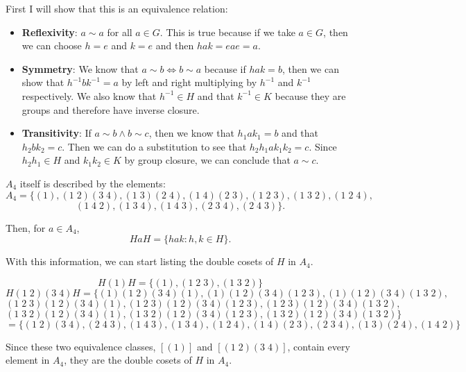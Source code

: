 \documentclass[12pt]{report}
\begin{document}
\sol First I will show that this is an equivalence relation:
\begin{itemize}
	\item \textbf{Reflexivity}: $a \sim a$ for all $a \in G$. This is true because if we take $a \in G$, then we can choose $h = e$ and $k = e$ and then $hak = eae = a$.
	\item \textbf{Symmetry}: We know that $a \sim b \Longleftrightarrow b \sim a$ because if $hak = b$, then we can show that $h^{-1}bk^{-1} = a$ by left and right multiplying by $h^{-1}$ and $k^{-1}$ respectively. We also know that $h^{-1} \in H$ and that $k^{-1} \in K$ because they are groups and therefore have inverse closure.
	\item \textbf{Transitivity}: If $a\sim b \land b \sim c$, then we know that $h_1ak_1 = b$ and that $h_2 b k_2 = c$. Then we can do a substitution to see that $h_2h_1 a k_1k_2 = c$. Since $h_2h_1 \in H$ and $k_1k_2 \in K$ by group closure, we can conclude that $a \sim c$.
\end{itemize}

$A_4$ itself is described by the elements: $$A_4 = \{(1), (1 \; 2)(3 \; 4), (1\; 3)(2\; 4), (1 \; 4)(2 \; 3), (1 \; 2 \; 3), (1 \; 3 \; 2), (1 \; 2 \; 4), $$$$(1 \; 4 \; 2), (1 \; 3 \; 4), (1 \; 4 \; 3), (2 \; 3 \; 4), (2 \; 4 \; 3)\}.$$

Then, for $a \in A_4$,
$$HaH = \{hak : h,k \in H\}.$$

With this information, we can start listing the double cosets of $H$ in $A_4$.

$$H(1)H = \{(1), (1 \; 2 \; 3), (1 \; 3 \; 2)\}$$
$$H(1 \; 2)(3 \; 4)H = \{(1)(1 \; 2)(3 \; 4)(1), (1)(1 \; 2)(3 \; 4)(1 \; 2 \; 3), (1)(1 \; 2)(3 \; 4)(1 \; 3\; 2), $$$$(1 \; 2 \; 3)(1 \; 2)(3 \; 4)(1), (1 \; 2 \; 3)(1 \; 2)(3 \; 4)(1 \; 2 \; 3), (1 \; 2 \;3)(1 \; 2)(3 \; 4)(1 \; 3 \; 2), $$$$(1 \; 3 \; 2)(1 \; 2)(3 \; 4)(1), (1 \; 3 \; 2)(1 \; 2)(3 \; 4)(1 \; 2 \; 3), (1 \; 3 \; 2)(1 \; 2)(3 \; 4)(1 \; 3 \; 2)\} $$$$= \{(1 \; 2)(3 \; 4), (2 \; 4 \; 3), (1 \; 4 \; 3), (1 \; 3 \; 4), (1 \;2 \; 4), (1 \; 4)(2 \; 3), (2 \; 3 \; 4), (1 \; 3)( 2 \; 4),(1 \; 4 \; 2)\} $$

Since these two equivalence classes, $[(1)]$ and $[(1 \; 2)(3 \; 4)]$, contain every element in $A_4$, they are the double cosets of $H$ in $A_4$.
\end{document}
